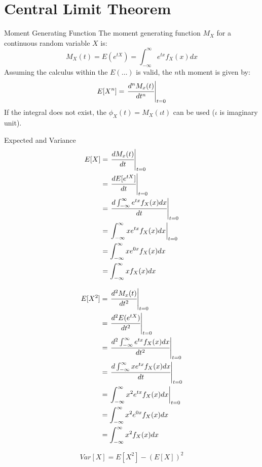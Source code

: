 \section{Central Limit Theorem}
\begin{definitionbox}{Moment Generating Function}
The moment generating function $M_X$ for a continuous random variable $X$ is:
\[M_X(t) = E(e^{tX}) = \int_{-\infty}^{\infty}e^{tx}f_X(x)dx\]
Assuming the calculus within the $E(\dots)$ is valid, the $n$th moment is given by:
\[E[X^n] = \left.\cfrac{d^nM_x(t)}{dt^n}\right|_{t=0}\]
If the integral does not exist, the  $\phi_X(t) = M_X(\iota t)$ can be used ($\iota$ is imaginary unit).
\end{definitionbox}

\begin{examplebox}{Expected and Variance}
	\[\begin{split}
			E[X] & = \left.\cfrac{dM_x(t)}{dt}\right|_{t=0} \\
			& = \left.\cfrac{dE[e^{tX}]}{dt}\right|_{t=0} \\
			& = \left.\cfrac{d \int_{-\infty}^{\infty}e^{tx}f_X(x)dx}{dt}\right|_{t=0} \\
			& = \left.\int_{-\infty}^{\infty}xe^{tx}f_X(x)dx\right|_{t=0} \\
			& = \int_{-\infty}^{\infty}xe^{0x}f_X(x)dx \\
			& = \int_{-\infty}^{\infty} x f_X(x) dx\\
		\end{split}\]

	\[\begin{split}
			E[X^2] & = \left.\cfrac{d^2M_x(t)}{dt^2}\right|_{t=0} \\
			& = \left.\cfrac{d^2E(e^{tX})}{dt^2}\right|_{t=0} \\
			& = \left.\cfrac{d^2 \int_{-\infty}^{\infty}e^{tx}f_X(x)dx}{dt^2}\right|_{t=0} \\
			& = \left.\cfrac{d \int_{-\infty}^{\infty}xe^{tx}f_X(x)dx}{dt}\right|_{t=0} \\
			& = \left.\int_{-\infty}^{\infty}x^2e^{tx}f_X(x)dx\right|_{t=0} \\
			& = \int_{-\infty}^{\infty}x^2e^{0x}f_X(x)dx \\
			& = \int_{-\infty}^{\infty}x^2f_X(x)dx \\
		\end{split}\]

	\[Var[X] =  E[X^2] - (E[X])^2\]
\end{examplebox}

